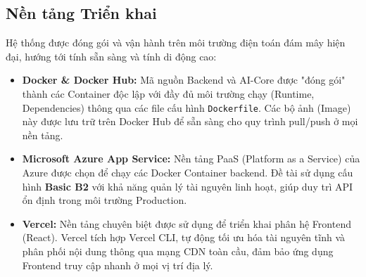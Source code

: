 \subsection{Nền tảng Triển khai}
\label{sec:3_5}

Hệ thống được đóng gói và vận hành trên môi trường điện toán đám mây hiện đại, hướng tới tính sẵn sàng và tính di động cao:
\begin{itemize}
    \item \textbf{Docker \& Docker Hub:} Mã nguồn Backend và AI-Core được "đóng gói" thành các Container độc lập với đầy đủ môi trường chạy (Runtime, Dependencies) thông qua các file cấu hình \texttt{Dockerfile}. Các bộ ảnh (Image) này được lưu trữ trên Docker Hub để sẵn sàng cho quy trình pull/push ở mọi nền tảng.
    \item \textbf{Microsoft Azure App Service:} Nền tảng PaaS (Platform as a Service) của Azure được chọn để chạy các Docker Container backend. Đề tài sử dụng cấu hình \textbf{Basic B2} với khả năng quản lý tài nguyên linh hoạt, giúp duy trì API ổn định trong môi trường Production.
    \item \textbf{Vercel:} Nền tảng chuyên biệt được sử dụng để triển khai phân hệ Frontend (React). Vercel tích hợp Vercel CLI, tự động tối ưu hóa tài nguyên tĩnh và phân phối nội dung thông qua mạng CDN toàn cầu, đảm bảo ứng dụng Frontend truy cập nhanh ở mọi vị trí địa lý.
\end{itemize}

